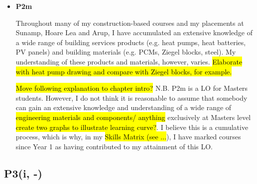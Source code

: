 \begin{itemize}
    \item \textbf{P2m}
    
    Throughout many of my construction-based courses and my placements at Sunamp, Hoare Lea and Arup,
    I have accumulated an extensive knowledge of a wide range of building services products (e.g. heat pumps, heat batteries, PV panels) and building materials (e.g. PCMs, Ziegel blocks, steel).
    My understanding of these products and materials, however, varies.
    \hl{Elaborate with heat pump drawing and compare with Ziegel blocks, for example.}
    
    \hl{Move following explanation to chapter intro?}
    N.B. P2m is a LO for Masters students.
    However, I do not think it is reasonable to assume that somebody can gain an extensive knowledge and understanding of a wide range of \hl{engineering materials and components/ anything} exclusively at Masters level \hl{create two graphs to illustrate learning curve?}.
    I believe this is a cumulative process, which is why, in my \hl{Skills Matrix (see ...}), I have marked courses since Year 1 as having contributed to my attainment of this LO.
\end{itemize}






\subsection*{P3(i, -)}

